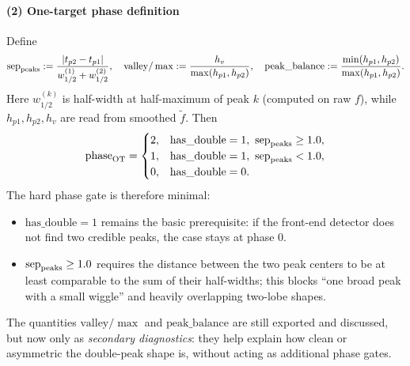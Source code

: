 \documentclass[11pt]{article}
\begin{document}
\paragraph{(2) One-target phase definition}
Define
\[
\mathrm{sep}_{\rm peaks}:=\frac{|t_{p2}-t_{p1}|}{w_{1/2}^{(1)}+w_{1/2}^{(2)}},\quad
\mathrm{valley}/\max:=\frac{h_v}{\max(h_{p1},h_{p2})},\quad
\mathrm{peak\_balance}:=\frac{\min(h_{p1},h_{p2})}{\max(h_{p1},h_{p2})}.
\]
Here $w_{1/2}^{(k)}$ is half-width at half-maximum of peak $k$ (computed on raw $f$), while $h_{p1},h_{p2},h_v$ are read from smoothed $\tilde f$.
Then
\[
\mathrm{phase}_{\rm OT}=
\begin{cases}
2,& \mathrm{has\_double}=1,\ \mathrm{sep}_{\rm peaks}\ge 1.0,\\
1,& \mathrm{has\_double}=1,\ \mathrm{sep}_{\rm peaks}< 1.0,\\
0,& \mathrm{has\_double}=0.
\end{cases}
\]
The hard phase gate is therefore minimal:
\begin{itemize}
  \item $\mathrm{has\_double}=1$ remains the basic prerequisite: if the front-end detector does not find two credible peaks, the case stays at phase 0.
  \item $\mathrm{sep}_{\rm peaks}\ge 1.0$ requires the distance between the two peak centers to be at least comparable to the sum of their half-widths; this blocks ``one broad peak with a small wiggle'' and heavily overlapping two-lobe shapes.
\end{itemize}
The quantities $\mathrm{valley}/\max$ and $\mathrm{peak\_balance}$ are still exported and discussed, but now only as \emph{secondary diagnostics}: they help explain how clean or asymmetric the double-peak shape is, without acting as additional phase gates.
\end{document}
